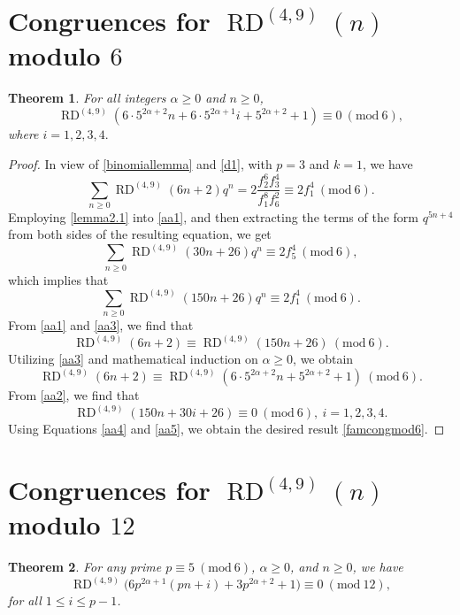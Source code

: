 \documentclass[12pt]{amsart}
\DeclareMathOperator {\myRD}{RD}
\theoremstyle{plain}
\newtheorem{theorem}{Theorem}[section]
\theoremstyle{definition}
\begin{document}
\section{Congruences for $\myRD^{(4, 9)}(n)$ modulo $6$}
 \begin{theorem} For all integers $\alpha \geq 0$ and $n\geq 0$,
 \begin{equation}
\myRD^{(4, 9)}(6\cdot 5^{2\alpha+2}n+6\cdot 5^{2\alpha+1}i+ 5^{2\alpha+2} +1 ) \equiv 0 \ (\mathrm{mod} \ 6), \label{famcongmod6}
\end{equation}
where $i=1,2,3,4.$
\end{theorem}

\begin{proof}
In view of \eqref{binomiallemma} and \eqref{d1}, with $p=3$ and $k=1$, we have
\begin{equation}
    \sum_{n\geq 0} \myRD^{(4, 9)}(6n+2) q^{n}=2\dfrac{f_{2}^{6}f_{3}^{4}}{f_{1}^{8}f_{6}^{2}} \equiv 2f_{1}^{4} \ (\mathrm{mod} \ 6). \label{aa1}
\end{equation}
Employing \eqref{lemma2.1} into \eqref{aa1}, and then extracting the terms of the form $q^{5n+4}$ from both sides of the resulting equation, we get
\begin{equation}
    \sum_{n\geq 0} \myRD^{(4, 9)}(30n+26) q^{n} \equiv 2f_{5}^{4} \ (\mathrm{mod} \ 6), \label{aa2}
\end{equation}
which implies that
\begin{equation}
    \sum_{n\geq 0} \myRD^{(4, 9)}(150n+26) q^{n} \equiv 2f_{1}^{4} \ (\mathrm{mod} \ 6). \label{aa3}
\end{equation}
From \eqref{aa1} and \eqref{aa3}, we find that
\[
    \myRD^{(4, 9)}(6n+2) \equiv \myRD^{(4, 9)}(150n+26)  \ (\mathrm{mod} \ 6). 
\]
Utilizing \eqref{aa3} and mathematical induction on $\alpha \geq 0$, we obtain
\begin{equation}
\myRD^{(4, 9)}(6n+2) \equiv \myRD^{(4, 9)}(6\cdot 5^{2\alpha+2}n+ 5^{2\alpha+2} +1)  \ (\mathrm{mod} \ 6).  \label{aa4}
\end{equation}
From \eqref{aa2}, we find that
\begin{equation}
     \myRD^{(4, 9)}(150n+30i+26)  \equiv 0 \ (\mathrm{mod} \ 6),  \ i=1,2,3,4. \label{aa5}
\end{equation}
Using Equations \eqref{aa4} and \eqref{aa5}, we obtain the desired result \eqref{famcongmod6}.
\end{proof}


 \section{Congruences for $\myRD^{(4, 9)}(n)$ modulo $12$}
 \begin{theorem} \label{thm} For any prime $p\equiv 5 \ (\mathrm{mod} \ 6)$, $\alpha \geq 0$, and $n\geq 0$, we have
\[
\myRD^{(4, 9)} \big(6p^{2\alpha+1}(pn+i)+3p^{2\alpha+2}+1 \big)\equiv 0 \ (\mathrm{mod} \ 12),
\]
for all $1\leq i \leq p-1$.
\end{theorem}
\end{document}
